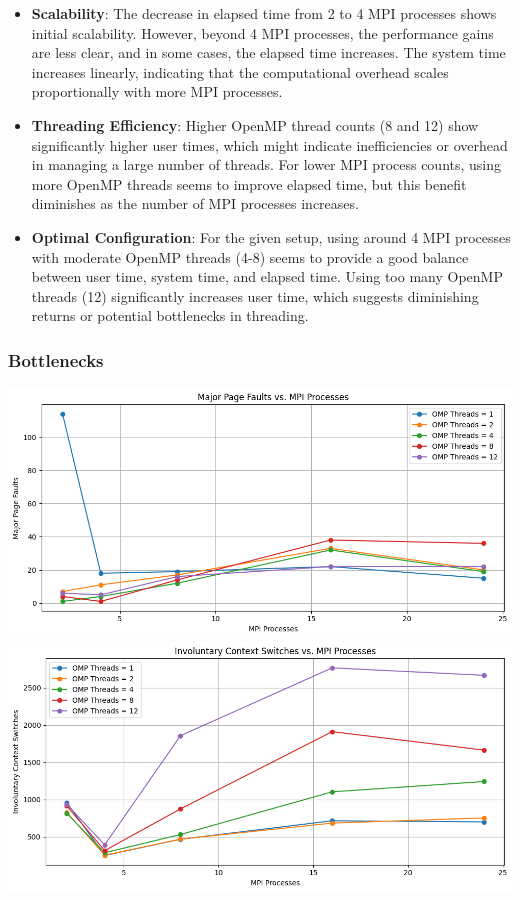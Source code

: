\documentclass[
]{article}
\begin{document}
\begin{itemize}
\item
  \textbf{Scalability}: The decrease in elapsed time from 2 to 4 MPI
  processes shows initial scalability. However, beyond 4 MPI processes,
  the performance gains are less clear, and in some cases, the elapsed
  time increases. The system time increases linearly, indicating that
  the computational overhead scales proportionally with more MPI
  processes.
\item
  \textbf{Threading Efficiency}: Higher OpenMP thread counts (8 and 12)
  show significantly higher user times, which might indicate
  inefficiencies or overhead in managing a large number of threads. For
  lower MPI process counts, using more OpenMP threads seems to improve
  elapsed time, but this benefit diminishes as the number of MPI
  processes increases.
\item
  \textbf{Optimal Configuration}: For the given setup, using around 4
  MPI processes with moderate OpenMP threads (4-8) seems to provide a
  good balance between user time, system time, and elapsed time. Using
  too many OpenMP threads (12) significantly increases user time, which
  suggests diminishing returns or potential bottlenecks in threading.
\end{itemize}

\subsubsection{Bottlenecks}\label{bottlenecks-2}

\includegraphics{figures/major_page.png}
\includegraphics{figures/inv_cont.png}
\end{document}

